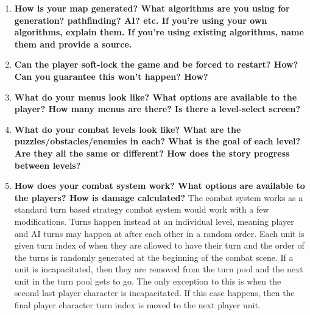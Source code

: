 \documentclass[12pt, titlepage]{article}
\begin{document}
\begin{enumerate}
	\item \textbf{How is your map generated? What algorithms are you using for generation? pathfinding? AI? etc. If you're using your own algorithms, explain them. If you're using existing algorithms, name them and provide a source.}
	\item \textbf{Can the player soft-lock the game and be forced to restart? How? Can you guarantee this won't happen? How?}
	\item \textbf{What do your menus look like? What options are available to the player? How many menus are there? Is there a level-select screen?}
	\item \textbf{What do your combat levels look like? What are the puzzles/obstacles/enemies in each? What is the goal of each level? Are they all the same or different? How does the story progress between levels?}
	\item \textbf{How does your combat system work? What options are available to the players? How is damage calculated?}
	The combat system works as a standard turn based strategy combat system would work with a few modifications. Turns happen instead at an individual level, meaning player and AI turns may happen at after each other in a random order. Each unit is given turn index of when they are allowed to have their turn and the order of the turns is randomly generated at the beginning of the combat scene. If a unit is incapacitated, then they are removed from the turn pool and the next unit in the turn pool gets to go. The only exception to this is when the second last player character is incapacitated. If this case happens, then the final player character turn index is moved to the next player unit.
	

\end{enumerate}
\end{document}
